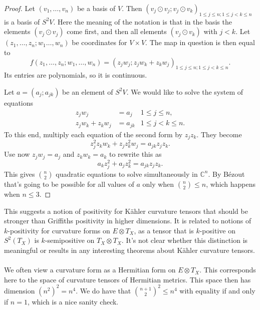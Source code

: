 \documentclass[11pt]{article}
\newtheorem*{proof}{Proof}
\newcommand{\kk}[1]{\mathbb{#1}}
\begin{document}
\begin{proof}
  Let $(v_1, \ldots, v_n)$ be a basis of $V$. Then $(v_j \odot v_j ; v_j \odot v_k)_{1 \leq j \leq n; 1 \leq j < k \leq n}$ is a basis of $S^2V$. Here the meaning of the notation is that in the basis the elements $(v_j \odot v_j)$ come first, and then all elements $(v_j \odot v_k)$ with $j < k$. Let $(z_1, \ldots, z_n; w_1 \ldots, w_n)$ be coordinates for $V \times V$. The map in question is then equal to
$$
f(z_1, \ldots, z_n; w_1, \ldots, w_n)
=( z_j w_j; z_j w_k + z_k w_j )_{1 \leq j \leq n; 1 \leq j < k \leq n}.
$$
Its entries are polynomials, so it is continuous.

Let $a = (a_j; a_{jk})$ be an element of $S^2V$. We would like to solve the system of equations
\begin{align*}
  z_j w_j &= a_j &1 \leq j \leq n,\\
  z_j w_k + z_k w_j &= a_{jk} &1 \leq j < k \leq n.
\end{align*}
To this end, multiply each equation of the second form by $z_jz_k$. They become
$$
z_j^2 z_k w_k + z_jz_k^2 w_j = a_{jk} z_jz_k.
$$
Use now $z_jw_j = a_j$ and $z_kw_k = a_k$ to rewrite this as
$$
a_k z_j^2 + a_j z_k^2 = a_{jk} z_jz_k.
$$
This gives $\binom n2$ quadratic equations to solve simultaneously in $\kk C^n$. By B\'ezout that's going to be possible for all values of $a$ only when $\binom n2 \leq n$, which happens when $n \leq 3$.
\end{proof}

This suggests a notion of positivity for K\"ahler curvature tensors that should be stronger than Griffiths positivity in higher dimensions. It is related to notions of $k$-positivity for curvature forms on $E \otimes T_X$, as a tensor that is $k$-positive on $S^2(T_X)$ is $k$-semipositive on $T_X \otimes T_X$. It's not clear whether this distinction is meaningful or results in any interesting theorems about K\"ahler curvature tensors.



\paragraph{}





We often view a curvature form as a Hermitian form on $E \otimes T_X$. This corresponds here to the space of curvature tensors of Hermitian metrics. This space then has dimension $(n^2)^2 = n^4$. We do have that $\binom{n+1}{2}^2 \leq n^4$ with equality if and only if $n = 1$, which is a nice sanity check.
\end{document}
